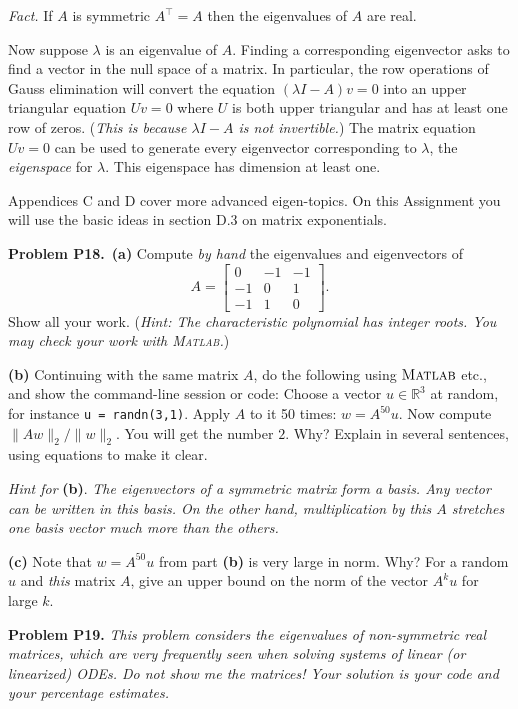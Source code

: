 \documentclass[12pt]{amsart}
\newcommand{\RR}{\mathbb{R}}
\newcommand{\Matlab}{\textsc{Matlab}\xspace}
\newcommand{\prob}[1]{\bigskip\noindent\textbf{#1}\quad }
\newcommand{\epart}[1]{\medskip\noindent\textbf{(#1)}\quad }
\newcommand{\ppart}[1]{\,\textbf{(#1)}\quad }
\begin{document}
\medskip
\emph{Fact.}  If $A$ is symmetric $A^\top = A$ then the eigenvalues of $A$ are real.

\medskip
Now suppose $\lambda$ is an eigenvalue of $A$.  Finding a corresponding eigenvector asks to find a vector in the null space of a matrix.  In particular, the row operations of Gauss elimination will convert the equation $(\lambda I - A) v = 0$ into an upper triangular equation $U v = 0$ where $U$ is both upper triangular and has at least one row of zeros.  (\emph{This is because $\lambda I - A$ is not invertible.})  The matrix equation $U v = 0$ can be used to generate every eigenvector corresponding to $\lambda$, the \emph{eigenspace} for $\lambda$.  This eigenspace has dimension at least one.

Appendices C and D cover more advanced eigen-topics.  On this Assignment you will use the basic ideas in section D.3 on matrix exponentials.

\noindent \hrulefill
\clearpage \newpage


\prob{Problem P18.}  \ppart{a}  Compute \emph{by hand} the eigenvalues and eigenvectors of
    $$A = \begin{bmatrix} 0 & -1 & -1 \\
                         -1 & 0  & 1 \\
                         -1 & 1  & 0  \end{bmatrix}.$$
Show all your work.  (\emph{Hint: The characteristic polynomial has integer roots.  You may \emph{check} your work with \Matlab.})

\epart{b}  Continuing with the same matrix $A$, do the following using $\Matlab$ etc., and show the command-line session or code:  Choose a vector $u\in\RR^3$ at random, for instance \texttt{u = randn(3,1)}.  Apply $A$ to it 50 times: $w = A^{50} u$.  Now compute $\|A w\|_2/\|w\|_2$.  You will get the number $2$.  Why?  Explain in several sentences, using equations to make it clear.

\medskip
\noindent \emph{Hint for} \textbf{(b)}.  \emph{The eigenvectors of a symmetric matrix form a basis.  Any vector can be written in this basis.  On the other hand, multiplication by \emph{this} $A$ stretches one basis vector much more than the others.}

\epart{c}  Note that $w = A^{50} u$ from part \textbf{(b)} is very large in norm.  Why?  For a random $u$ and \emph{this} matrix $A$, give an upper bound on the norm of the vector $A^k u$ for large $k$.


\prob{Problem P19.}  \emph{This problem considers the eigenvalues of \emph{non-symmetric} real matrices, which are very frequently seen when solving systems of linear (or linearized) ODEs.  Do not show me the matrices!  Your solution is your code and your percentage estimates.}
\end{document}
